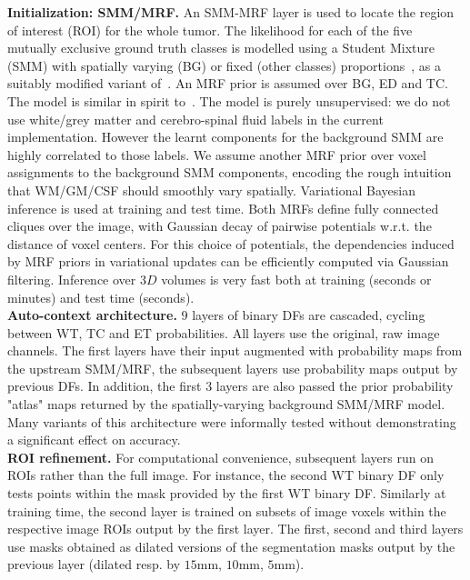 \noindent
\textbf{Initialization: SMM/MRF.} An SMM-MRF layer is used to locate the region of interest (ROI) for the whole tumor. The likelihood for each of the five mutually exclusive ground truth classes is modelled using a Student Mixture (SMM) with spatially varying (BG) or fixed (other classes) proportions~\cite{archambeau2007robust}, as a suitably modified variant of~\cite{cordier2015patch}. An MRF prior is assumed over BG, ED and TC. The model is similar in spirit to~\cite{zhang2001segmentation,menze2010generative}. The model is purely unsupervised: we do not use white/grey matter and cerebro-spinal fluid labels in the current implementation. However the learnt components for the background SMM are highly correlated to those labels. We assume another MRF prior over voxel assignments to the background SMM components, encoding the rough intuition that WM/GM/CSF should smoothly vary spatially. Variational Bayesian inference is used at training and test time. Both MRFs define fully connected cliques over the image, with Gaussian decay of pairwise potentials w.r.t. the distance of voxel centers. For this choice of potentials, the dependencies induced by MRF priors in variational updates can be efficiently computed via Gaussian filtering. Inference over $3D$ volumes is very fast both at training (seconds or minutes) and test time (seconds).\\

\noindent
\textbf{Auto-context architecture.} $9$ layers of binary DFs are cascaded, cycling between WT, TC and ET probabilities. All layers use the original, raw image channels. The first layers have their input augmented with probability maps from the upstream SMM/MRF, the subsequent layers use probability maps output by previous DFs. In addition, the first $3$ layers are also passed the prior probability "atlas" maps returned by the spatially-varying background SMM/MRF model. Many variants of this architecture were informally tested without demonstrating a significant effect on accuracy.\\

\noindent
\textbf{ROI refinement.} For computational convenience, subsequent layers run on ROIs rather than the full image. For instance, the second WT binary DF only tests points within the mask provided by the first WT binary DF. Similarly at training time, the second layer is trained on subsets of image voxels within the respective image ROIs output by the first layer. The first, second and third layers use masks obtained as dilated versions of the segmentation masks output by the previous layer (dilated resp. by $15$mm, $10$mm, $5$mm).\\

